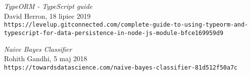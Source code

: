 \begin{thebibliography}{20}
\textit{TypeORM - TypeScript guide}
\\David Herron, 18 lipiec 2019
\\\texttt{https://levelup.gitconnected.com/complete-guide-to-using-typeorm-and-typescript-for-data-persistence-in-node-js-module-bfce169959d9}

\textit{Naive Bayes Classifier}
\\Rohith Gandhi, 5 maj 2018
\\\texttt{https://towardsdatascience.com/naive-bayes-classifier-81d512f50a7c}





\end{thebibliography}